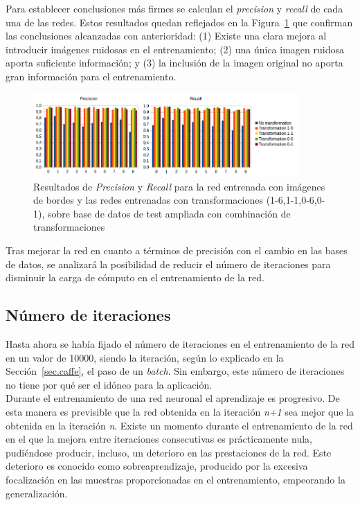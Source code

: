 Para establecer conclusiones más firmes se calculan el \textit{precision} y \textit{recall} de cada una de las redes. Estos resultados quedan reflejados en la Figura~\ref{fig.precision-recall} que confirman las conclusiones alcanzadas con anterioridad: (1) Existe una clara mejora al introducir imágenes ruidosas en el entrenamiento; (2) una única imagen ruidosa aporta suficiente información; y (3) la inclusión de la imagen original no aporta gran información para el entrenamiento.\\
\begin{figure}[H]
	\centering
	\includegraphics[width=0.9\textwidth]{figures/precision-recall}
	\caption{Resultados de \textit{Precision} y \textit{Recall} para la red entrenada con imágenes de bordes y las redes entrenadas con transformaciones (1-6,1-1,0-6,0-1), sobre base de datos de test ampliada con combinación de transformaciones}
	\label{fig.precision-recall}
\end{figure}


Tras mejorar la red en cuanto a términos de precisión con el cambio en las bases de datos, se analizará la posibilidad de reducir el número de iteraciones para disminuir la carga de cómputo en el entrenamiento de la red.

\subsection{Número de iteraciones}
Hasta ahora se había fijado el número de iteraciones en el entrenamiento de la red en un valor de 10000, siendo la iteración, según lo explicado en la Sección~\ref{sec.caffe}, el paso de un \textit{batch}. Sin embargo, este número de iteraciones no tiene por qué ser el idóneo para la aplicación.\\

Durante el entrenamiento de una red neuronal el aprendizaje es progresivo. De esta manera es previsible que la red obtenida en la iteración \textit{n+1} sea mejor que la obtenida en la iteración \textit{n}. Existe un momento durante el entrenamiento de la red en el que la mejora entre iteraciones consecutivas es prácticamente nula, pudiéndose producir, incluso, un deterioro en las prestaciones de la red. Este deterioro es conocido como sobreaprendizaje, producido por la excesiva focalización en las muestras proporcionadas en el entrenamiento, empeorando la generalización.\\
\vspace{10pt}

